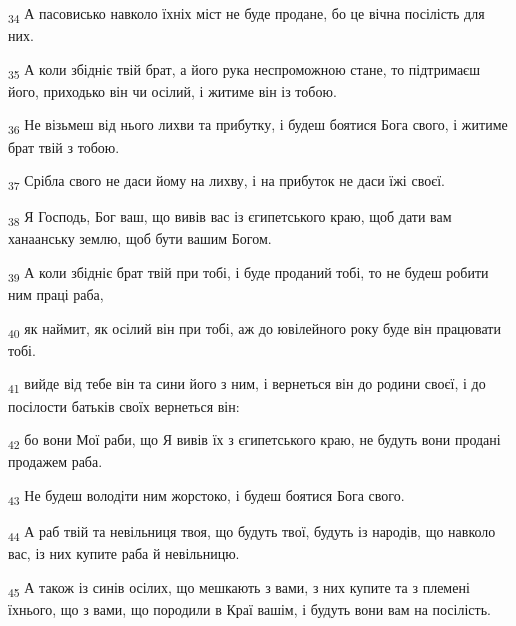 \begin{tcolorbox}
\textsubscript{34} А пасовисько навколо їхніх міст не буде продане, бо це вічна посілість для них.
\end{tcolorbox}
\begin{tcolorbox}
\textsubscript{35} А коли збідніє твій брат, а його рука неспроможною стане, то підтримаєш його, приходько він чи осілий, і житиме він із тобою.
\end{tcolorbox}
\begin{tcolorbox}
\textsubscript{36} Не візьмеш від нього лихви та прибутку, і будеш боятися Бога свого, і житиме брат твій з тобою.
\end{tcolorbox}
\begin{tcolorbox}
\textsubscript{37} Срібла свого не даси йому на лихву, і на прибуток не даси їжі своєї.
\end{tcolorbox}
\begin{tcolorbox}
\textsubscript{38} Я Господь, Бог ваш, що вивів вас із єгипетського краю, щоб дати вам ханаанську землю, щоб бути вашим Богом.
\end{tcolorbox}
\begin{tcolorbox}
\textsubscript{39} А коли збідніє брат твій при тобі, і буде проданий тобі, то не будеш робити ним праці раба,
\end{tcolorbox}
\begin{tcolorbox}
\textsubscript{40} як наймит, як осілий він при тобі, аж до ювілейного року буде він працювати тобі.
\end{tcolorbox}
\begin{tcolorbox}
\textsubscript{41} вийде від тебе він та сини його з ним, і вернеться він до родини своєї, і до посілости батьків своїх вернеться він:
\end{tcolorbox}
\begin{tcolorbox}
\textsubscript{42} бо вони Мої раби, що Я вивів їх з єгипетського краю, не будуть вони продані продажем раба.
\end{tcolorbox}
\begin{tcolorbox}
\textsubscript{43} Не будеш володіти ним жорстоко, і будеш боятися Бога свого.
\end{tcolorbox}
\begin{tcolorbox}
\textsubscript{44} А раб твій та невільниця твоя, що будуть твої, будуть із народів, що навколо вас, із них купите раба й невільницю.
\end{tcolorbox}
\begin{tcolorbox}
\textsubscript{45} А також із синів осілих, що мешкають з вами, з них купите та з племені їхнього, що з вами, що породили в Краї вашім, і будуть вони вам на посілість.
\end{tcolorbox}
